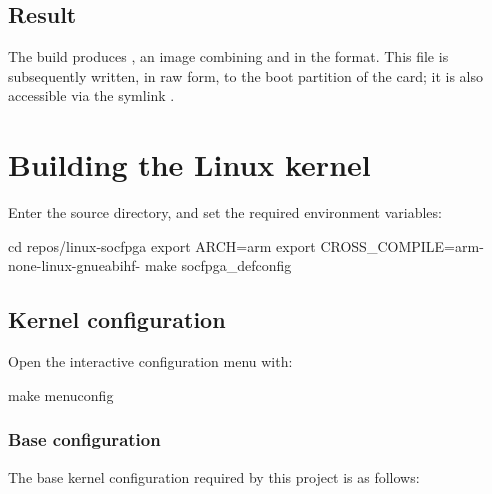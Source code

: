 
\subsection{Result}

The build produces , an image combining  and  in the   format. This file is subsequently written, in raw form, to the boot partition of the  card; it is also accessible via the symlink .

\section{Building the Linux kernel}
\label{sec:fpgalix-kernel}

Enter the  source directory, and set the required environment variables:

\begin{shellcodehost}
cd repos/linux-socfpga
export ARCH=arm
export CROSS_COMPILE=arm-none-linux-gnueabihf-
make socfpga_defconfig
\end{shellcodehost}

\subsection{Kernel configuration}

Open the interactive configuration menu with:

\begin{shellcodehost}
make menuconfig
\end{shellcodehost}

\subsubsection{Base configuration}

The base kernel configuration required by this project is as follows:

